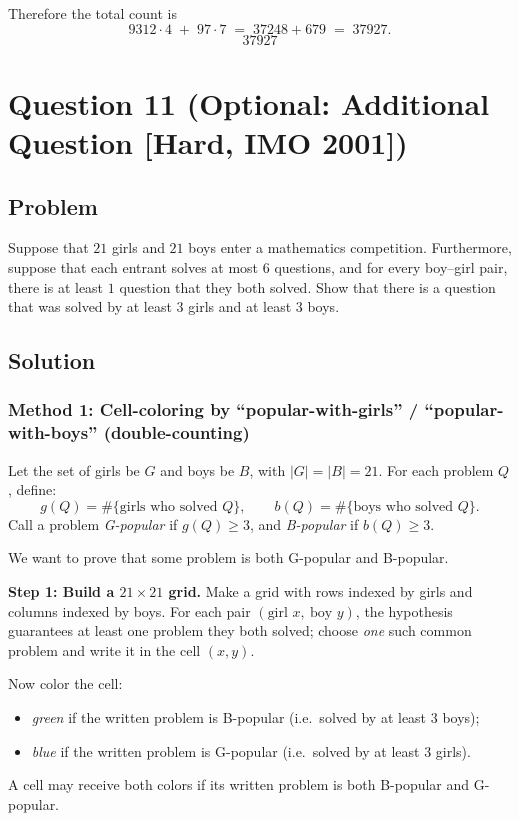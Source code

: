 \documentclass[12pt]{article}
\begin{document}
\begin{enumerate}[label=(\alph*)]
Therefore the total count is
\[
9312\cdot 4 \;+\; 97\cdot 7 \;=\; 37248+679 \;=\; 37927.
\]
\[
\boxed{37927}
\]
\end{enumerate}

\newpage

\section{Question 11 (Optional: Additional Question [Hard, IMO 2001])}
\subsection{Problem}
Suppose that $21$ girls and $21$ boys enter a mathematics competition. Furthermore, suppose that each entrant solves at most $6$ questions, and for every boy--girl pair, there is at least $1$ question that they both solved. Show that there is a question that was solved by at least $3$ girls and at least $3$ boys.

\subsection{Solution}

\subsubsection{Method 1: Cell-coloring by ``popular-with-girls'' / ``popular-with-boys'' (double-counting)}
Let the set of girls be $G$ and boys be $B$, with $|G|=|B|=21$. For each problem $Q$, define:
\[
g(Q)=\#\{\text{girls who solved }Q\},\qquad b(Q)=\#\{\text{boys who solved }Q\}.
\]
Call a problem \emph{G-popular} if $g(Q)\ge 3$, and \emph{B-popular} if $b(Q)\ge 3$.

We want to prove that some problem is both G-popular and B-popular.

\medskip
\noindent\textbf{Step 1: Build a $21\times 21$ grid.}
Make a grid with rows indexed by girls and columns indexed by boys. For each pair $(\text{girl }x,\ \text{boy }y)$, the hypothesis guarantees at least one problem they both solved; choose \emph{one} such common problem and write it in the cell $(x,y)$.

Now color the cell:
\begin{itemize}[leftmargin=*]
\item \emph{green} if the written problem is B-popular (i.e.\ solved by at least $3$ boys);
\item \emph{blue} if the written problem is G-popular (i.e.\ solved by at least $3$ girls).
\end{itemize}
A cell may receive both colors if its written problem is both B-popular and G-popular.
\end{document}
